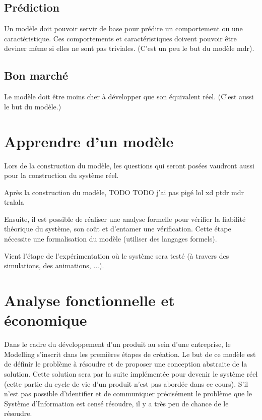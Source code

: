 \subsection{Prédiction}

Un modèle doit pouvoir servir de base pour prédire un comportement ou une caractéristique. Ces comportements et caractéristiques doivent pouvoir être deviner même si elles ne sont pas triviales. (C'est un peu le but du modèle mdr).

\subsection{Bon marché}

Le modèle doit être moins cher à développer que son équivalent réel. (C'est aussi le but du modèle.)

\section{Apprendre d'un modèle}

Lors de la construction du modèle, les questions qui seront posées vaudront aussi pour la construction du système réel.

Après la construction du modèle, TODO TODO j'ai pas pigé lol xd ptdr mdr tralala

Ensuite, il est possible de réaliser une analyse formelle pour vérifier la fiabilité théorique du système, son coût et d'entamer une vérification. Cette étape nécessite une formalisation du modèle (utiliser des langages formels).

Vient l'étape de l'expérimentation où le système sera testé (à travers des simulations, des animations, ...).

\section{Analyse fonctionnelle et économique}

Dans le cadre du développement d'un produit au sein d'une entreprise, le Modelling s'inscrit dans les premières étapes de création. Le but de ce modèle est de définir le problème à résoudre et de proposer une conception abstraite de la solution. Cette solution sera par la suite implémentée pour devenir le système réel (cette partie du cycle de vie d'un produit n'est pas abordée dans ce cours). S'il n'est pas possible d'identifier et de communiquer précisément le problème que le Système d'Information est censé résoudre, il y a très peu de chance de le résoudre.

